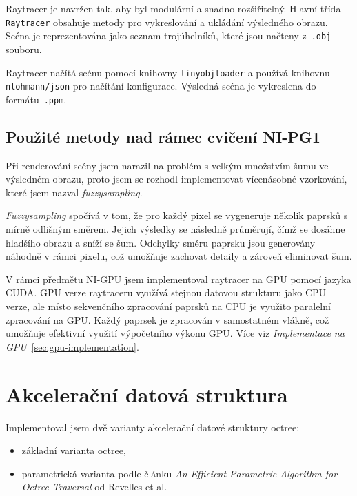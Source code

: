 \documentclass[10pt,a4paper]{article}
\begin{document}
Raytracer je navržen tak, aby byl modulární a snadno rozšiřitelný. Hlavní třída \texttt{Raytracer} obsahuje metody pro vykreslování a ukládání výsledného obrazu. Scéna je reprezentována jako seznam trojúhelníků, které jsou načteny z~\texttt{.obj} souboru.

Raytracer načítá scénu pomocí knihovny \texttt{tinyobjloader} a používá knihovnu \texttt{nlohmann/json} pro načítání konfigurace. Výsledná scéna je vykreslena do formátu~\texttt{.ppm}.

\subsection{Použité metody nad rámec cvičení NI-PG1}
\label{sec:used-methods}

Při renderování scény jsem narazil na problém s velkým množstvím šumu ve výsledném obrazu, proto jsem se rozhodl implementovat vícenásobné vzorkování, které jsem nazval \textit{fuzzysampling}.

\textit{Fuzzysampling} spočívá v tom, že pro každý pixel se vygeneruje několik paprsků s mírně odlišným směrem. Jejich výsledky se následně průměrují, čímž se dosáhne hladšího obrazu a sníží se šum. Odchylky směru paprsku jsou generovány náhodně v rámci pixelu, což umožňuje zachovat detaily a zároveň eliminovat šum.

V rámci předmětu NI-GPU jsem implementoval raytracer na GPU pomocí jazyka CUDA. GPU verze raytraceru využívá stejnou datovou strukturu jako CPU verze, ale místo sekvenčního zpracování paprsků na CPU je využito paralelní zpracování na GPU. Každý paprsek je zpracován v samostatném vlákně, což umožňuje efektivní využití výpočetního výkonu GPU. Více viz \textit{Implementace na GPU}~\ref{sec:gpu-implementation}.


\section{Akcelerační datová struktura}

Implementoval jsem dvě varianty akcelerační datové struktury octree:
\begin{itemize}
    \item základní varianta octree,
    \item parametrická varianta podle článku \textit{An Efficient Parametric Algorithm for Octree Traversal} od Revelles et al.
\end{itemize}
\end{document}
